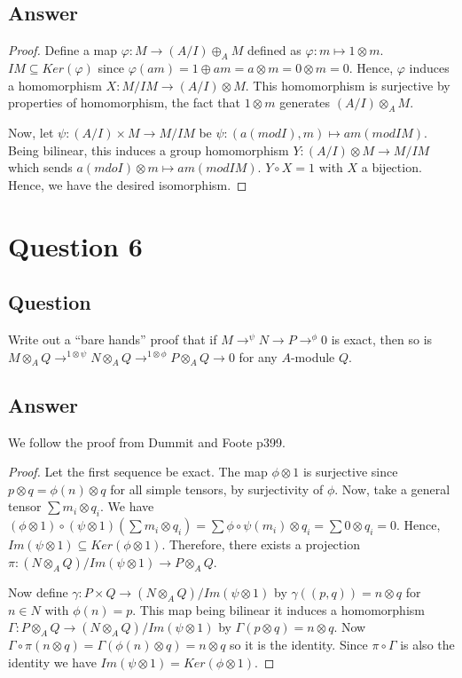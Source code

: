 \documentclass[11pt]{article}
\begin{document}
\subsection{Answer}
\begin{proof}
Define a map $\varphi: M \to ( A /I) \oplus_A M$ defined as $\varphi: m \mapsto 1 \otimes m$.  $IM \subseteq Ker(\varphi)$ since $\varphi(a m) = 1 \oplus a m = a \otimes m = 0 \otimes m =0$. Hence, $\varphi$ induces a homomorphism $X: M /IM \to (A/I) \otimes M$.  This homomorphism is surjective by properties of homomorphism, the fact that $1 \otimes m $ generates $(A/I) \otimes_A M$.

Now, let $\psi: (A / I) \times M \to M / I M $  be $\psi: (a ( mod I ),m) \mapsto am (mod IM)$. Being bilinear, this induces a group homomorphism $Y: (A/I) \otimes M \to M/IM$ which sends $a (mdo I) \otimes m \mapsto am (mod IM).$  $Y \circ X =1 $ with $X$ a bijection. Hence, we have the desired isomorphism.
\end{proof}


\section{Question 6}
\subsection{Question}
Write out a ``bare hands'' proof that if $M \to^\psi N \to P \to^\phi 0$ is exact, then so is $M \otimes_A Q \to^{1 \otimes \psi} N \otimes_AQ \to^{1 \otimes \phi} P \otimes_A Q \to 0$ for any $A$-module $Q$.
\subsection{Answer}
We follow the proof from Dummit and Foote p399.
\begin{proof}
Let the first sequence be exact. The map $\phi \otimes 1$ is surjective since $p \otimes q = \phi(n) \otimes q$ for all simple tensors, by surjectivity of $\phi$. Now, take a general tensor $\sum m _i \otimes q_i$. We have $(\phi \otimes1) \circ ( \psi \otimes 1)(\sum m_i \otimes q_i) = \sum \phi \circ \psi(m_i) \otimes q_i = \sum 0 \otimes q_i=0$. Hence, $Im ( \psi \otimes 1) \subseteq Ker(\phi \otimes 1)$. Therefore, there exists a projection $\pi: (N \otimes_A Q ) / Im(\psi \otimes 1) \to P \otimes_A Q$.

Now define $\gamma: P \times Q \to ( N \otimes_A Q )/Im(\psi \otimes 1)$ by $\gamma((p,q))=n \otimes q$ for $n \in N$ with $\phi(n) =p$. This map being bilinear it induces a homomorphism $\Gamma: P \otimes_A Q \to (N \otimes_A Q) / Im(\psi \otimes 1)$ by $\Gamma(p \otimes q) = n \otimes q$. Now $\Gamma \circ \pi(n \otimes q) = \Gamma(\phi (n) \otimes q) = n \otimes q$ so it is the identity. Since $\pi \circ \Gamma $ is also the identity we have $Im(\psi \otimes 1) = Ker(\phi \otimes 1)$.
\end{proof}
\end{document}
